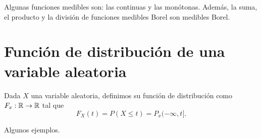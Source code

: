 Algunas funciones medibles son: las continuas y las monótonas. Además, la suma, el producto y la división de funciones medibles Borel son medibles Borel.


\section{Función de distribución de una variable aleatoria}

\begin{definition}
    Dada $X$ una variable aleatoria, definimos su función de distribución como $F_x : \mathbb{R} \to \mathbb{R}$ tal que
    \begin{equation*}
        F_X(t) = P(X \leq t) = P_x(-\infty, t].
    \end{equation*}
\end{definition}

Algunos ejemplos.

